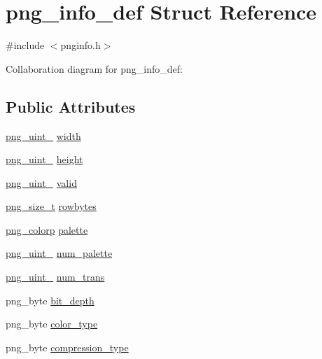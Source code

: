 \hypertarget{structpng__info__def}{}\section{png\+\_\+info\+\_\+def Struct Reference}
\label{structpng__info__def}


{\ttfamily \#include $<$pnginfo.\+h$>$}



Collaboration diagram for png\+\_\+info\+\_\+def\+:
\subsection*{Public Attributes}
\begin{DoxyCompactItemize}
\item 
\hyperlink{pngrutil_8c_a89824d0e9f0724e3e7799b01a2b5fe58}{png\+\_\+uint\+\_} \hyperlink{structpng__info__def_ac487ded925efc3985d1f6f873d2f2014}{width}
\item 
\hyperlink{pngrutil_8c_a89824d0e9f0724e3e7799b01a2b5fe58}{png\+\_\+uint\+\_} \hyperlink{structpng__info__def_ade3d79dce8b63cbfdd6150c4c30e51f4}{height}
\item 
\hyperlink{pngrutil_8c_a89824d0e9f0724e3e7799b01a2b5fe58}{png\+\_\+uint\+\_} \hyperlink{structpng__info__def_a8695fb4fae2b7d0c8a5be4f4c563aa8a}{valid}
\item 
\hyperlink{pngconf_8h_a975e35d0a699ea3b08b8feef90fd29eb}{png\+\_\+size\+\_\+t} \hyperlink{structpng__info__def_ad8db9ce83eb9f443fddd006a2d0d6589}{rowbytes}
\item 
\hyperlink{png_8h_a0fffc4de82c4f4a2211026316653b03c}{png\+\_\+colorp} \hyperlink{structpng__info__def_af032d4977f69766baf6ed147abc5ee27}{palette}
\item 
\hyperlink{pngrutil_8c_a7b67546e4211b127dd370e8ef197bc3f}{png\+\_\+uint\+\_} \hyperlink{structpng__info__def_aa7b651d53768b70da1910bf750ddb341}{num\+\_\+palette}
\item 
\hyperlink{pngrutil_8c_a7b67546e4211b127dd370e8ef197bc3f}{png\+\_\+uint\+\_} \hyperlink{structpng__info__def_ac088b6ab245f61f474ba56a66ec7e787}{num\+\_\+trans}
\item 
png\+\_\+byte \hyperlink{structpng__info__def_a437ea0466fea89c1794a8e3aa8d4da9e}{bit\+\_\+depth}
\item 
png\+\_\+byte \hyperlink{structpng__info__def_aa89dde7a6d87c229e9a4d6313fb4537b}{color\+\_\+type}
\item 
png\+\_\+byte \hyperlink{structpng__info__def_ab282a14aee6f0e080a7a4399b412fd20}{compression\+\_\+type}

\end{DoxyCompactItemize}

